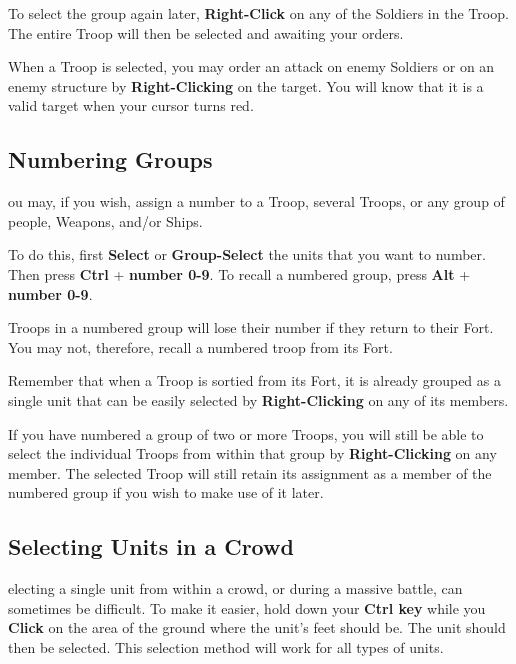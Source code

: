 To select the group again later, \textbf{Right-Click} on any of the Soldiers in the Troop. The entire Troop will then be selected and awaiting your orders.

When a Troop is selected, you may order an attack on enemy Soldiers or on an enemy structure by \textbf{Right-Clicking} on the target. You will know that it is a valid target when your cursor turns red.

\subsection{Numbering Groups}


ou may, if you wish, assign a number to a Troop, several Troops, or any group of people, Weapons, and/or Ships.

To do this, first \textbf{Select} or \textbf{Group-Select} the units that you want to number. Then press \textbf{Ctrl} + \textbf{number 0-9}. To recall a numbered group, press \textbf{Alt} + \textbf{number 0-9}.

Troops in a numbered group will lose their number if they return to their Fort. You may not, therefore, recall a numbered troop from its Fort.

Remember that when a Troop is sortied from its Fort, it is already grouped as a single unit that can be easily selected by \textbf{Right-Clicking} on any of its members.

If you have numbered a group of two or more Troops, you will still be able to select the individual Troops from within that group by \textbf{Right-Clicking} on any member. The selected Troop will still retain its assignment as a member of the numbered group if you wish to make use of it later.

\subsection{Selecting Units in a Crowd}


electing a single unit from within a crowd, or during a massive battle, can sometimes be difficult. To make it easier, hold down your \textbf{Ctrl key} while you \textbf{Click} on the area of the ground where the unit’s feet should be. The unit should then be selected. This selection method will work for all types of units.

